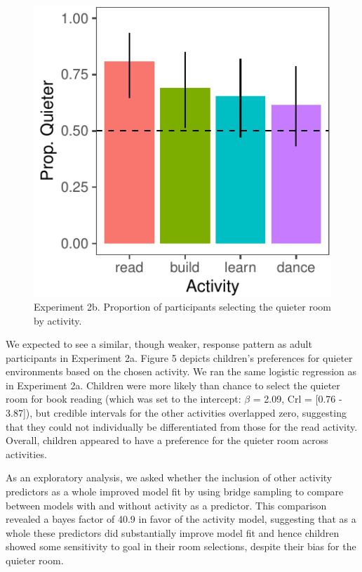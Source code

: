 \documentclass[10pt, letterpaper]{article}
\newenvironment{CodeChunk}{}{}
\begin{document}
\begin{CodeChunk}
\begin{figure}[t]

{\centering \includegraphics{figs/2b-bar-1} 

}

\caption[Experiment 2b]{Experiment 2b. Proportion of participants selecting the quieter room by activity.}\label{fig:2b-bar}
\end{figure}
\end{CodeChunk}

We expected to see a similar, though weaker, response pattern as adult
participants in Experiment 2a. Figure 5 depicts children's preferences
for quieter environments based on the chosen activity. We ran the same
logistic regression as in Experiment 2a. Children were more likely than
chance to select the quieter room for book reading (which was set to the
intercept: \(\beta\) = 2.09, Crl = {[}0.76 - 3.87{]}), but credible
intervals for the other activities overlapped zero, suggesting that they
could not individually be differentiated from those for the read
activity. Overall, children appeared to have a preference for the
quieter room across activities.

As an exploratory analysis, we asked whether the inclusion of other
activity predictors as a whole improved model fit by using bridge
sampling to compare between models with and without activity as a
predictor. This comparison revealed a bayes factor of 40.9 in favor of
the activity model, suggesting that as a whole these predictors did
substantially improve model fit and hence children showed some
sensitivity to goal in their room selections, despite their bias for the
quieter room.
\end{document}
